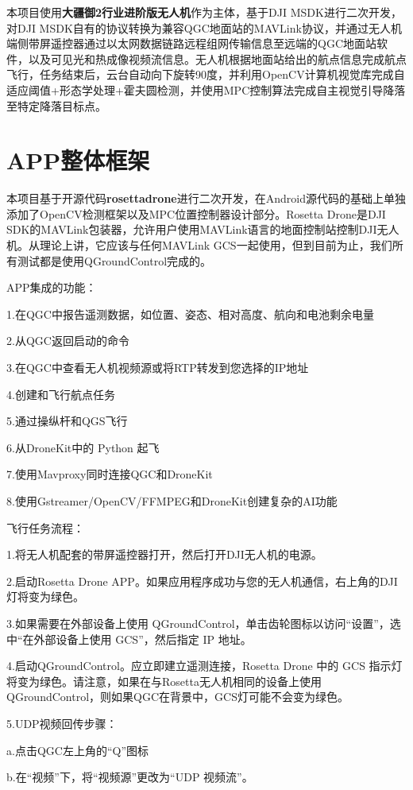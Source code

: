 本项目使用\textbf{大疆御2行业进阶版无人机}作为主体，基于DJI MSDK进行二次开发，对DJI MSDK自有的协议转换为兼容QGC地面站的MAVLink协议，并通过无人机端侧带屏遥控器通过以太网数据链路远程组网传输信息至远端的QGC地面站软件，以及可见光和热成像视频流信息。无人机根据地面站给出的航点信息完成航点飞行，任务结束后，云台自动向下旋转90度，并利用OpenCV计算机视觉库完成自适应阈值+形态学处理+霍夫圆检测，并使用MPC控制算法完成自主视觉引导降落至特定降落目标点。

\section{APP整体框架}

本项目基于开源代码\textbf{rosettadrone}进行二次开发，在Android源代码的基础上单独添加了OpenCV检测框架以及MPC位置控制器设计部分\cite{ArtE11}。Rosetta Drone是DJI SDK的MAVLink包装器，允许用户使用MAVLink语言的地面控制站控制DJI无人机。从理论上讲，它应该与任何MAVLink GCS一起使用，但到目前为止，我们所有测试都是使用QGroundControl完成的。\cite{ArtE12}

APP集成的功能：

1.在QGC中报告遥测数据，如位置、姿态、相对高度、航向和电池剩余电量

2.从QGC返回启动的命令

3.在QGC中查看无人机视频源或将RTP转发到您选择的IP地址

4.创建和飞行航点任务

5.通过操纵杆和QGS飞行

6.从DroneKit中的 Python 起飞

7.使用Mavproxy同时连接QGC和DroneKit

8.使用Gstreamer/OpenCV/FFMPEG和DroneKit创建复杂的AI功能

飞行任务流程：

1.将无人机配套的带屏遥控器打开，然后打开DJI无人机的电源。

2.启动Rosetta Drone APP。如果应用程序成功与您的无人机通信，右上角的DJI灯将变为绿色。

3.如果需要在外部设备上使用 QGroundControl，单击齿轮图标以访问“设置”，选中“在外部设备上使用 GCS”，然后指定 IP 地址。

4.启动QGroundControl。应立即建立遥测连接，Rosetta Drone 中的 GCS 指示灯将变为绿色。请注意，如果在与Rosetta无人机相同的设备上使用QGroundControl，则如果QGC在背景中，GCS灯可能不会变为绿色。

5.UDP视频回传步骤：

a.点击QGC左上角的“Q”图标

b.在“视频”下，将“视频源”更改为“UDP 视频流”。

